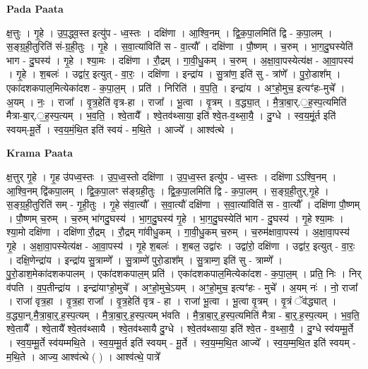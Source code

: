 \documentclass[17pt]{extarticle}
\begin{document}
\textbf{Pada Paata} \newline

क्ष॒त्तुः । गृ॒हे । उ॒प॒द्ध्व॒स्त इत्यु॑प - ध्व॒स्तः । दक्षि॑णा । आ॒श्वि॒नम् । द्वि॒क॒पा॒लमिति॑ द्वि - क॒पा॒लम् । स॒ङ्ग्र॒ही॒तुरिति॑ सं-ग्र॒ही॒तुः । गृ॒हे । स॒वा॒त्या॑विति॑ स - वा॒त्यौ᳚ । दक्षि॑णा । पौ॒ष्णम् । च॒रुम् । भा॒ग॒दु॒घस्येति॑ भाग - दु॒घस्य॑ । गृ॒हे । श्या॒मः । दक्षि॑णा । रौ॒द्रम् । गा॒वी॒धु॒कम् । च॒रुम् । अ॒क्षा॒वा॒पस्येत्य॑क्ष - आ॒वा॒पस्य॑ । गृ॒हे । श॒बलः॑ । उद्वा॑र॒ इत्युत् - वा॒रः॒ । दक्षि॑णा । इन्द्रा॑य । सु॒त्रांण॒ इति॑ सु - त्रांणे᳚ । पु॒रो॒डाश᳚म् । एका॑दशकपाल॒मित्येका॑दश - क॒पा॒ल॒म् । प्रति॑ । निरिति॑ । व॒प॒ति॒ । इन्द्रा॑य । अꣳ॒॒हो॒मुच॒ इत्यꣳ॑हः-मुचे᳚ । अ॒यम् । नः॒ । राजा᳚ । वृ॒त्र॒हेति॑ वृत्र-हा । राजा᳚ । भू॒त्वा । वृ॒त्रम् । व॒द्ध्या॒त् । मै॒त्रा॒बा॒र्.॒ह॒स्प॒त्यमिति॑ मैत्रा-बा॒र्.॒ह॒स्प॒त्यम् । भ॒व॒ति॒ । श्वे॒तायै᳚ । श्वे॒तव॑थ्साया॒ इति॑ श्वे॒त-व॒थ्सा॒यै॒ । दु॒ग्धे । स्व॒य॒मूं॒र्त इति॑ स्वयम्-मू॒र्ते । स्व॒य॒मं॒थि॒त इति॑ स्वयं - म॒थि॒ते । आज्ये᳚ । आश्व॑त्थे ।  \newline


\textbf{Krama Paata} \newline

क्ष॒त्तुर् गृ॒हे । गृ॒ह उ॑पध्व॒स्तः । उ॒प॒ध्व॒स्तो दक्षि॑णा । उ॒प॒ध्व॒स्त इत्यु॑प - ध्व॒स्तः । दक्षि॑णा ऽऽश्वि॒नम् । आ॒श्वि॒नम् द्वि॑कपा॒लम् । द्वि॒क॒पा॒लꣳ स॑ङ्ग्रही॒तुः । द्वि॒क॒पा॒लमिति॑ द्वि - क॒पा॒लम् । स॒ङ्ग्र॒ही॒तुर्,गृ॒हे । स॒ङ्ग्र॒ही॒तुरिति॑ सम् - गृ॒ही॒तुः । गृ॒हे स॑वा॒त्यौ᳚ । स॒वा॒त्यौ॑ दक्षि॑णा । स॒वा॒त्या॑विति॑ स - वा॒त्यौ᳚ । दक्षि॑णा पौ॒ष्णम् । पौ॒ष्णम् च॒रुम् । च॒रुम् भा॑गदु॒घस्य॑ । भा॒ग॒दु॒घस्य॑ गृ॒हे । भा॒ग॒दु॒घस्येति॑ भाग - दु॒घस्य॑ । गृ॒हे श्या॒मः । श्या॒मो दक्षि॑णा । दक्षि॑णा रौ॒द्रम् । रौ॒द्रम् गा॑वीधु॒कम् । गा॒वी॒धु॒कम् च॒रुम् । च॒रुम॑क्षावा॒पस्य॑ । अ॒क्षा॒वा॒पस्य॑ गृ॒हे । अ॒क्षा॒वा॒पस्येत्य॑क्ष - आ॒वा॒पस्य॑ । गृ॒हे श॒बलः॑ । श॒बल॒ उद्वा॑रः । उद्वा॑रो॒ दक्षि॑णा । उद्वा॑र॒ इत्युत् - वा॒रः॒ । दक्षि॒णेन्द्रा॑य । इन्द्रा॑य सु॒त्राम्णे᳚ । सु॒त्राम्णे॑ पुरो॒डाश᳚म् । सु॒त्राम्ण॒ इति॑ सु - त्राम्णे᳚ । पु॒रो॒डाश॒मेका॑दशकपालम् । एका॑दशकपाल॒म् प्रति॑ । एका॑दशकपाल॒मित्येका॑दश - क॒पा॒ल॒म् । प्रति॒ निः । निर् व॑पति । व॒प॒तीन्द्रा॑य । इन्द्रा॑याꣳहो॒मुचे᳚ । अꣳ॒॒हो॒मुचे॒ऽयम् । अꣳ॒॒हो॒मुच॒ इत्यꣳ॑हः - मुचे᳚ । अ॒यम् नः॑ । नो॒ राजा᳚ । राजा॑ वृत्र॒हा । वृ॒त्र॒हा राजा᳚ । वृ॒त्र॒हेति॑ वृत्र - हा । राजा॑ भू॒त्वा । भू॒त्वा वृ॒त्रम् । वृ॒त्रं ॅव॑द्ध्यात् । व॒द्ध्या॒न्,मै॒त्रा॒बा॒र्॒.ह॒स्प॒त्यम् । मै॒त्रा॒बा॒र्॒.ह॒स्प॒त्यम् भ॑वति । मै॒त्रा॒बा॒र्॒.ह॒स्प॒त्यमिति॑ मैत्रा - बा॒र्॒.ह॒स्प॒त्यम् । भ॒व॒ति॒ श्वे॒तायै᳚ । श्वे॒तायै᳚ श्वे॒तव॑थ्सायै । श्वे॒तव॑थ्सायै दु॒ग्धे । श्वे॒तव॑थ्साया॒ इति॑ श्वे॒त - व॒थ्सा॒यै॒ । दु॒ग्धे स्व॑यम्मू॒र्ते । स्व॒य॒म्मू॒र्ते स्व॑यम्मथि॒ते । स्व॒य॒म्मू॒र्त इति॑ स्वयम् - मू॒र्ते । स्व॒य॒म्म॒थि॒त आज्ये᳚ । स्व॒य॒म्म॒थि॒त इति॑ स्वयम् - म॒थि॒ते । आज्य॒ आश्व॑त्थे ( ) । आश्व॑त्थे॒ पात्रे᳚ \newline
\end{document}
